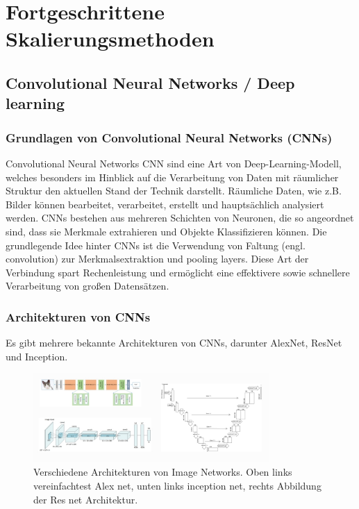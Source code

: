 


\chapter{Fortgeschrittene Skalierungsmethoden}
\section{Convolutional Neural Networks / Deep learning}
    \subsection{Grundlagen von Convolutional Neural Networks (CNNs)}
        Convolutional Neural Networks \ac{CNN} sind eine Art von Deep-Learning-Modell, welches besonders im Hinblick auf die Verarbeitung von Daten mit räumlicher Struktur den aktuellen Stand der Technik darstellt.      
        Räumliche Daten, wie z.B.      Bilder können bearbeitet, verarbeitet, erstellt und hauptsächlich analysiert werden.      
        CNNs bestehen aus mehreren Schichten von Neuronen, die so angeordnet sind, dass sie Merkmale extrahieren und Objekte Klassifizieren können.
        Die grundlegende Idee hinter CNNs ist die Verwendung von Faltung (engl.      convolution) zur Merkmalsextraktion und pooling layers.      
        Diese Art der Verbindung spart Rechenleistung und ermöglicht eine effektivere sowie schnellere Verarbeitung von großen Datensätzen.
    \subsection{Architekturen von CNNs}
    
        Es gibt mehrere bekannte Architekturen von CNNs, darunter AlexNet, ResNet und Inception.

        \begin{figure}[h]
            \centering
            \includegraphics[width=0.8\textwidth]{img/different_types_of_cnn_nets.jpg}
            \caption{Verschiedene Architekturen von Image Networks. Oben links vereinfachtest Alex net, unten links inception net, rechts Abbildung der Res net Architektur.}
            \label{fig:my_label}
        \end{figure}
        
